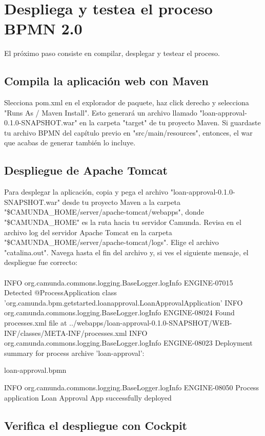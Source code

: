 \documentclass{article}
\begin{document}
\section{Despliega y testea el proceso BPMN 2.0}

El próximo paso consiste en compilar, desplegar y testear el proceso.

\subsection{Compila la aplicación web con Maven}

Slecciona pom.xml en el explorador de paquete, haz click derecho y selecciona "Runs As / Maven Install". Esto generará un archivo llamado "loan-approval-0.1.0-SNAPSHOT.war" en la carpeta "target" de tu proyecto Maven.
Si guardaste tu archivo BPMN del capítulo previo en "src/main/resources", entonces, el war que acabas de generar también lo incluye.

\subsection{Despliegue de Apache Tomcat}

Para desplegar la aplicación, copia y pega el archivo "loan-approval-0.1.0-SNAPSHOT.war" desde tu proyecto Maven a la carpeta "\$CAMUNDA\_HOME/server/apache-tomcat/webapps", donde "\$CAMUNDA\_HOME" es la ruta hacia tu servidor Camunda.
Revisa en el archivo log del servidor Apache Tomcat en la carpeta "\$CAMUNDA\_HOME/server/apache-tomcat/logs". Elige el archivo "catalina.out". Navega hasta el fin del archivo y, si ves el siguiente mensaje, el despliegue fue correcto:\\
\\

INFO org.camunda.commons.logging.BaseLogger.logInfo
ENGINE-07015 Detected @ProcessApplication class 'org.camunda.bpm.getstarted.loanapproval.LoanApprovalApplication'
INFO org.camunda.commons.logging.BaseLogger.logInfo
ENGINE-08024 Found processes.xml file at ../webapps/loan-approval-0.1.0-SNAPSHOT/WEB-INF/classes/META-INF/processes.xml
INFO org.camunda.commons.logging.BaseLogger.logInfo
ENGINE-08023 Deployment summary for process archive 'loan-approval':

        loan-approval.bpmn

INFO org.camunda.commons.logging.BaseLogger.logInfo
ENGINE-08050 Process application Loan Approval App successfully deployed

\subsection{Verifica el despliegue con Cockpit}
\end{document}
